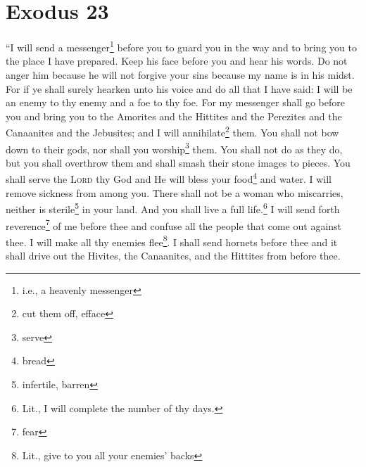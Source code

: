 \section{Exodus 23}\label{Exodus 23}
\begin{enumerate}
     ``I will send a messenger\footnote{i.e., a heavenly messenger} before you to guard you in the way and to bring you to the place I have prepared.%
     Keep his face before you and hear his words. Do not anger him because he will not forgive your sins because my name is in his midst.%
     For if ye shall surely hearken unto his voice and do all that I have said: I will be an enemy to thy enemy and a foe to thy foe.%
     For my messenger shall go before you and bring you to the Amorites and the Hittites and the Perezites and the Canaanites and the Jebusites; and I will annihilate\footnote{cut them off, efface} them.%
     You shall not bow down to their gods, nor shall you worship\footnote{serve} them. You shall not do as they do, but you shall overthrow them and shall smash their stone images to pieces.%
     You shall serve the \textsc{Lord} thy God and He will bless your food\footnote{bread} and water. I will remove sickness from among you.%
     There shall not be a woman who miscarries, neither is sterile\footnote{infertile, barren} in your land. And you shall live a full life.\footnote{Lit., I will complete the number of thy days.}%
     I will send forth reverence\footnote{fear} of me before thee and confuse all the people that come out against thee. I will make all thy enemies flee\footnote{Lit., give to you all your enemies' backs}.%
     I shall send hornets before thee and it shall drive out the Hivites, the Canaanites, and the Hittites from before thee.%

\end{enumerate}

